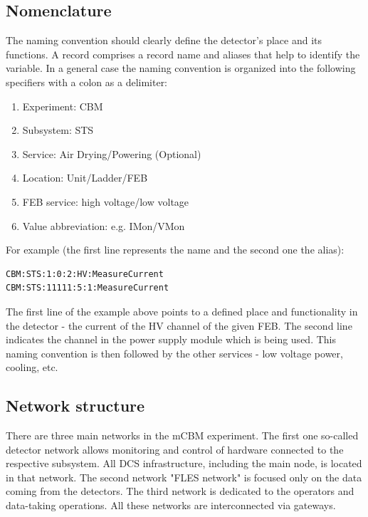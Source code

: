 \subsection{Nomenclature}
The naming convention should clearly define the detector's place and its functions. A record comprises a record name and aliases that help to identify the variable. In a general case the naming convention is organized into the following specifiers with a colon as a delimiter:
\begin{enumerate} 
\item Experiment: CBM
\item Subsystem: STS
\item Service: Air Drying/Powering (Optional)
\item Location: Unit/Ladder/FEB
\item \gls{FEB} service: high voltage/low voltage
\item Value abbreviation: e.g. IMon/VMon
\end{enumerate}

For example (the first line represents the name and the second one the alias):
\begin{verbatim}
CBM:STS:1:0:2:HV:MeasureCurrent
CBM:STS:11111:5:1:MeasureCurrent
\end{verbatim}
The first line of the example above points to a defined place and functionality in the detector - the current of the HV channel of the given \gls{FEB}. The second line indicates the channel in the power supply module which is being used. This naming convention is then followed by the other services - low voltage power, cooling, etc.  
\subsection{Network structure}
There are three main networks in the mCBM experiment. The first one so-called detector network allows monitoring and control of hardware connected to the respective subsystem. All \gls{DCS} infrastructure, including the main node, is located in that network. The second network "FLES network" is focused only on the data coming from the detectors. The third network is dedicated to the operators and data-taking operations. All these networks are interconnected via gateways.  

